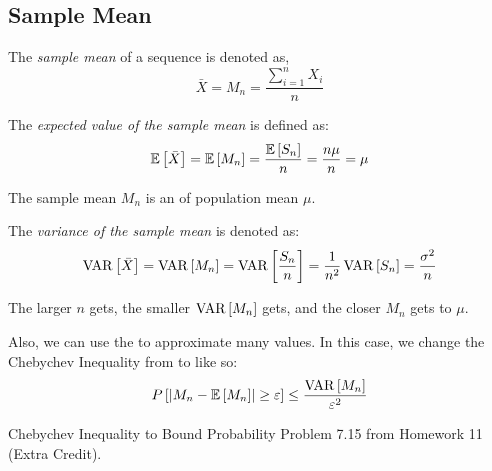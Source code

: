 	\subsection{Sample Mean} \label{subsec:Sample Mean}
		\begin{definition} \label{def:Sample Mean}
			The \emph{sample mean} of a sequence is denoted as,
			\begin{equation} \label{eq:Sample Mean}
				\bar{X} = M_{n} = \frac{\sum_{i=1}^{n} X_{i}}{n}
			\end{equation}
		\end{definition}
		\begin{definition} \label{def:Expected Value of Sample Mean}
			The \emph{expected value of the sample mean} is defined as:
			\begin{equation} \label{eq:Expected Value of Sample Mean}
				\operatorname{\operatorname{\mathbb{E}}} \left[ \bar{X} \right]
				= \operatorname{\operatorname{\mathbb{E}}} \left[ M_{n} \right]
				= \frac{\operatorname{\operatorname{\mathbb{E}}} \left[ S_{n} \right]}{n}
				= \frac{n \mu}{n}
				= \mu
			\end{equation}
			\begin{remark}
				The sample mean $M_{n}$ is an \emph{} of population mean $\mu$.
			\end{remark}
		\end{definition}
		\begin{definition} \label{def:Variance of Sample Mean}
			The \emph{variance of the sample mean} is denoted as:
			\begin{equation} \label{eq:Variance of Sample Mean}
				\operatorname{\operatorname{VAR}} \left[ \bar{X} \right]
				= \operatorname{\operatorname{VAR}} \left[ M_{n} \right]
				= \operatorname{\operatorname{VAR}} \left[ \frac{S_{n}}{n} \right]
				= \frac{1}{n^{2}} \operatorname{\operatorname{VAR}} \left[ S_{n} \right]
				= \frac{\sigma^{2}}{n}
			\end{equation}
			\begin{remark}
				The larger $n$ gets, the smaller $\operatorname{\operatorname{VAR}} \left[ M_{n} \right]$ gets, and the closer $M_{n}$ gets to $\mu$.
			\end{remark}
		\end{definition}
			
	Also, we can use the  to approximate many values. In this case, we change the Chebychev Inequality from  to  like so:
		\begin{equation} \label{eq:Statistics Chebychev Inequality}
			P \left[ \lvert M_{n} - \operatorname{\operatorname{\mathbb{E}}} \left[ M_{n} \right] \rvert \geq \varepsilon \right] \leq \frac{\operatorname{\operatorname{VAR}} \left[ M_{n} \right]}{\varepsilon^{2}}
		\end{equation}
		\begin{example}[Problem 7.15]{Chebychev Inequality to Bound Probability}
			Problem 7.15 from Homework 11 (Extra Credit).
		\end{example}
		
